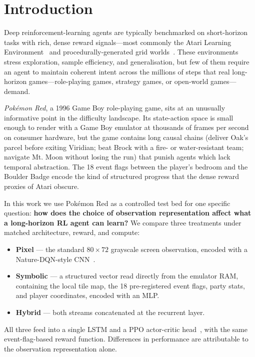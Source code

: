 \section{Introduction}
\label{sec:intro}

Deep reinforcement-learning agents are typically benchmarked on
short-horizon tasks with rich, dense reward signals---most commonly the
Atari Learning Environment~\citep{bellemare2013arcade,mnih2015atari}
and procedurally-generated grid worlds~\citep{cobbe2020procgen,
matthews2024craftax,samvelyan2021minihack}.  These environments stress
exploration, sample efficiency, and generalisation, but few of them
require an agent to maintain coherent intent across the millions of
steps that real long-horizon games---role-playing games, strategy
games, or open-world games---demand.

\emph{Pok\'emon Red}, a 1996 Game Boy role-playing game, sits at an
unusually informative point in the difficulty landscape.  Its
state-action space is small enough to render with a Game Boy emulator
at thousands of frames per second on consumer hardware, but the game
contains long causal chains (deliver Oak's parcel before exiting Viridian;
beat Brock with a fire- or water-resistant team; navigate Mt. Moon
without losing the run) that punish agents which lack temporal
abstraction.  The 18 event flags between the player's bedroom and the
Boulder Badge encode the kind of structured progress that the dense
reward proxies of Atari obscure.

In this work we use Pok\'emon Red as a controlled test bed for one
specific question: \textbf{how does the choice of observation
representation affect what a long-horizon RL agent can learn?}  We
compare three treatments under matched architecture, reward, and
compute:
%
\begin{itemize}
\item \textbf{Pixel} --- the standard $80 \times 72$ grayscale screen
  observation, encoded with a Nature-DQN-style
  CNN~\citep{mnih2015atari}.
\item \textbf{Symbolic} --- a structured vector read directly from the
  emulator RAM, containing the local tile map, the 18 pre-registered
  event flags, party stats, and player coordinates, encoded with an
  MLP.
\item \textbf{Hybrid} --- both streams concatenated at the recurrent
  layer.
\end{itemize}
%
All three feed into a single LSTM and a PPO actor-critic
head~\citep{schulman2017ppo,hausknecht2015drqn}, with the same
event-flag-based reward function.  Differences in performance are
attributable to the observation representation alone.

